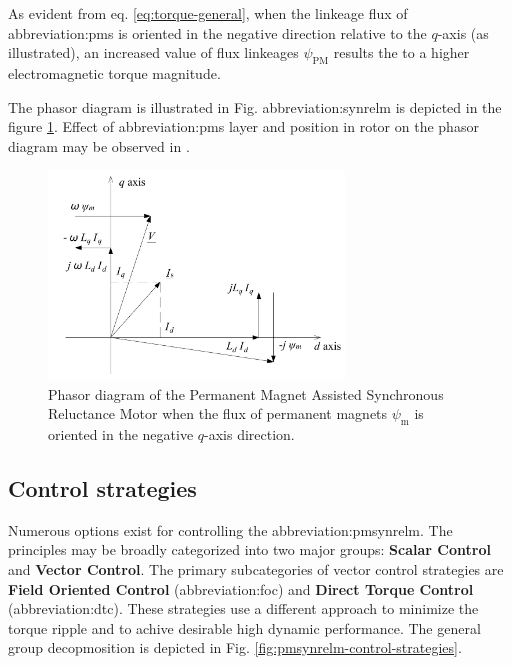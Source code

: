 \documentclass[a4paper, twoside, 11pt]{article}
\begin{document}
        \par
        As evident from eq. \ref{eq:torque-general}, when the linkeage flux of \gls{abbreviation:pm}s is oriented in the negative direction relative to the $q$-axis (as illustrated), an increased value of flux linkeages $\psi_\text{PM}$ results the to a higher electromagnetic torque magnitude.\par
        
        The phasor diagram is illustrated in Fig. \gls{abbreviation:synrelm} is depicted in the figure \ref{fig:cad-pmasynrm-vector-diagram}. Effect of \gls{abbreviation:pm}s layer and position in rotor on the phasor diagram may be observed in \cite{huynh-design-and-analysis-of-perm-as-synch-rel-m}.
        \begin{figure}[htbp!]
            \centering
            \includegraphics[width=0.70\textwidth]{src/pdf/cad-pmasynrm-vector-diagram.pdf}
            \caption{Phasor diagram of the Permanent Magnet Assisted Synchronous Reluctance Motor when the flux of permanent magnets $\psi_\text{m}$ is oriented in the negative $q$-axis direction.}
            \label{fig:cad-pmasynrm-vector-diagram}
        \end{figure}
    
    \par

    \subsection{Control strategies}

        Numerous options exist for controlling the \gls{abbreviation:pmsynrelm}. The principles may be broadly categorized into two major groups: \textbf{Scalar Control} and \textbf{Vector Control}. The primary subcategories of vector control strategies are \textbf{Field Oriented Control} (\gls{abbreviation:foc}) and \textbf{Direct Torque Control} (\gls{abbreviation:dtc}). These strategies use a different approach to minimize the torque ripple and to achive desirable high dynamic performance. \cite{dwivedi-review-on-control-strategies-of-permanent-magnet-assisted-synchronous-reluctance-motor-drive} The general group decopmosition is depicted in Fig. \ref{fig:pmsynrelm-control-strategies}.
\end{document}

